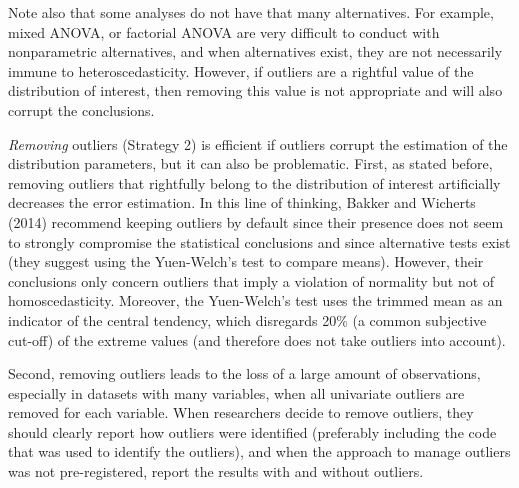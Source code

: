\documentclass[man,floatsintext]{apa6}
\begin{document}
Note also that some analyses do not have that many alternatives. For
example, mixed ANOVA, or factorial ANOVA are very difficult to conduct
with nonparametric alternatives, and when alternatives exist, they are
not necessarily immune to heteroscedasticity. However, if outliers are a
rightful value of the distribution of interest, then removing this value
is not appropriate and will also corrupt the conclusions.

\emph{Removing} outliers (Strategy 2) is efficient if outliers corrupt
the estimation of the distribution parameters, but it can also be
problematic. First, as stated before, removing outliers that rightfully
belong to the distribution of interest artificially decreases the error
estimation. In this line of thinking, Bakker and Wicherts (2014)
recommend keeping outliers by default since their presence does not seem
to strongly compromise the statistical conclusions and since alternative
tests exist (they suggest using the Yuen-Welch's test to compare means).
However, their conclusions only concern outliers that imply a violation
of normality but not of homoscedasticity. Moreover, the Yuen-Welch's
test uses the trimmed mean as an indicator of the central tendency,
which disregards 20\% (a common subjective cut-off) of the extreme
values (and therefore does not take outliers into account).

Second, removing outliers leads to the loss of a large amount of
observations, especially in datasets with many variables, when all
univariate outliers are removed for each variable. When researchers
decide to remove outliers, they should clearly report how outliers were
identified (preferably including the code that was used to identify the
outliers), and when the approach to manage outliers was not
pre-registered, report the results with and without outliers.
\end{document}

